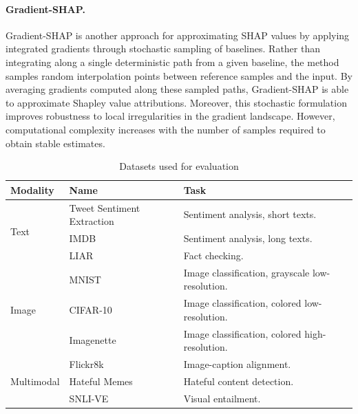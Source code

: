 \paragraph{Gradient-SHAP.}
Gradient-SHAP \cite{gradient_shap} is another approach for approximating SHAP values by applying integrated gradients through stochastic sampling of baselines. Rather than integrating along a single deterministic path from a given baseline, the method samples random interpolation points between reference samples and the input. By averaging gradients computed along these sampled paths, Gradient-SHAP is able to approximate Shapley value attributions. Moreover, this stochastic formulation improves robustness to local irregularities in the gradient landscape. However, computational complexity increases with the number of samples required to obtain stable estimates.



\begin{table}[t!]
    \centering
    \footnotesize
    \def\arraystretch{0.9}
    \caption{Datasets used for evaluation} \label{tab:datasets}
    \begin{tabular}{llp{7cm}}
        \toprule
        \textbf{Modality} & \textbf{Name} & \textbf{Task} \\
        \midrule
        \multirow{3}{*}{Text} & Tweet Sentiment Extraction & Sentiment analysis, short texts. \\ 
                              & IMDB                       & Sentiment analysis, long texts. \\
                              & LIAR                       & Fact checking. \\
        \midrule
        \multirow{3}{*}{Image} & MNIST      & Image classification, grayscale low-resolution. \\ 
                               & CIFAR-10   & Image classification, colored low-resolution. \\ 
                               & Imagenette & Image classification, colored high-resolution. \\ 
        \midrule
        \multirow{3}{*}{Multimodal} & Flickr8k & Image-caption alignment. \\ 
                                    & Hateful Memes & Hateful content detection. \\ 
                                    & SNLI-VE & Visual entailment. \\ 
        \bottomrule
    \end{tabular}
\end{table}

